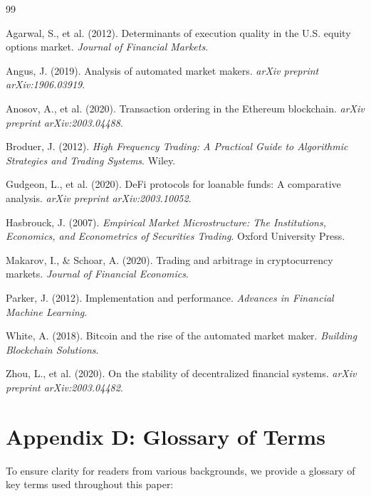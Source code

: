 \documentclass[12pt,a4paper]{article}
\begin{document}
\begin{thebibliography}{99}

Agarwal, S., et al. (2012). Determinants of execution quality in the U.S. equity options market. \textit{Journal of Financial Markets}.

Angus, J. (2019). Analysis of automated market makers. \textit{arXiv preprint arXiv:1906.03919}.

Anosov, A., et al. (2020). Transaction ordering in the Ethereum blockchain. \textit{arXiv preprint arXiv:2003.04488}.

Broduer, J. (2012). \textit{High Frequency Trading: A Practical Guide to Algorithmic Strategies and Trading Systems}. Wiley.

Gudgeon, L., et al. (2020). DeFi protocols for loanable funds: A comparative analysis. \textit{arXiv preprint arXiv:2003.10052}.

Hasbrouck, J. (2007). \textit{Empirical Market Microstructure: The Institutions, Economics, and Econometrics of Securities Trading}. Oxford University Press.

Makarov, I., \& Schoar, A. (2020). Trading and arbitrage in cryptocurrency markets. \textit{Journal of Financial Economics}.

Parker, J. (2012). Implementation and performance. \textit{Advances in Financial Machine Learning}.

White, A. (2018). Bitcoin and the rise of the automated market maker. \textit{Building Blockchain Solutions}.

Zhou, L., et al. (2020). On the stability of decentralized financial systems. \textit{arXiv preprint arXiv:2003.04482}.

\section*{Appendix D: Glossary of Terms}

To ensure clarity for readers from various backgrounds, we provide a glossary of key terms used throughout this paper:


\end{thebibliography}
\end{document}
